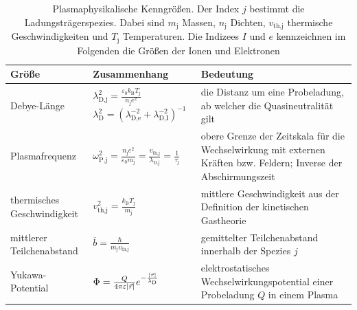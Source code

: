\documentclass[numbers=noenddot,a4paper,notitlepage,twoside,BCOR15mm]{scrbook}
\newcommand{\ix}[1]{_\text{#1}}
\newcommand{\euler}{\mathnormal{e}}
\begin{document}
				\begin{table}[H]
					\centering
						\begin{tabular}{m{0.3\textwidth}|m{}|m{}}
							Größe & Zusammenhang & Bedeutung \\ 
							\hline  Debye-Länge & $\lambda\ix{D,j}^2=\frac{\varepsilon\ix{0}k\ix{B}T\ix{j}}{n\ix{j}e^2}$
							\newline
							$\lambda\ix{D}^2=\left(\lambda\ix{D,e}^{-2}+\lambda\ix{D,I}^{-2}\right)^{-1}$ & die Distanz um eine Probeladung, ab welcher die Quasineutralität gilt\\ 

							\hline Plasmafrequenz & $\omega\ix{P,j}^2=\frac{n\ix{j}e^2}{\varepsilon\ix{0}m\ix{j}}=\frac{v\ix{th,j}}{\lambda\ix{D,j}}=\frac{1}{\tau\ix{j}}$ & obere Grenze der Zeitskala für die Wechselwirkung mit externen Kräften bzw. Feldern; Inverse der Abschirmungszeit \\ 

							\hline thermisches Geschwindigkeit & $v\ix{th,j}^2=\frac{k\ix{B}T\ix{j}}{m\ix{j}}$ & mittlere Geschwindigkeit aus der Definition der kinetischen Gastheorie \\ 

							\hline mittlerer Teilchenabstand & $\overline{b}=\frac{\hbar}{m\ix{j}v\ix{th,j}}$ & gemittelter Teilchenabstand innerhalb der Spezies $j$ \\ 

							\hline Yukawa-Potential & $\Phi=\frac{Q}{4\pi\varepsilon|\vec{r}|}\euler^{-\frac{|\vec{r}|}{\lambda\ix{D}}}$ & elektrostatisches Wechselwirkungspotential einer Probeladung $Q$ in einem Plasma \\

							\hline

						\end{tabular}
					\caption{Plasmaphysikalische Kenngrößen. Der Index $j$ bestimmt die Ladungsträgerspezies. Dabei sind $m\ix{j}$ Massen, $n\ix{j}$ Dichten, $v\ix{th,j}$ thermische Geschwindigkeiten und $T\ix{j}$ Temperaturen. Die Indizees $I$ und $e$ kennzeichnen im Folgenden die Größen der Ionen und Elektronen}
					\label{tab:kenngroessen}
				\end{table}
\end{document}
